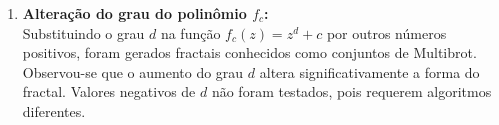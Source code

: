 \begin{enumerate}[label=(\alph*)]
    \item \textbf{Alteração do grau do polinômio \( f_c \):} \\
    
        Substituindo o grau \( d \) na função \( f_c(z) = z^d + c \) por outros números positivos, foram gerados fractais conhecidos como conjuntos de Multibrot. Observou-se que o aumento do grau \( d \) altera significativamente a forma do fractal. Valores negativos de \( d \) não foram testados, pois requerem algoritmos diferentes.
\end{enumerate}

